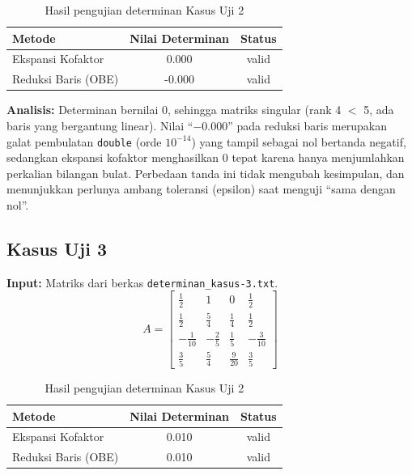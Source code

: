 \documentclass[12pt,a4paper]{report}
\begin{document}
\begin{table}[H]
    \centering
    \caption{Hasil pengujian determinan Kasus Uji 2}
    \begin{tabular}{|l|c|c|}
        \hline 

        \textbf{Metode} & \textbf{Nilai Determinan} & \textbf{Status} \\
        \hline
        Ekspansi Kofaktor & 0.000 & valid \\
        Reduksi Baris (OBE) & -0.000 & valid \\
        \hline
    \end{tabular}
\end{table}
 
\textbf{Analisis:} Determinan bernilai 0, sehingga matriks singular (rank 4 $<$ 5, ada baris yang bergantung linear). Nilai ``$-0.000$'' pada reduksi baris merupakan galat pembulatan \texttt{double} (orde $10^{-14}$) yang tampil sebagai nol bertanda negatif, sedangkan ekspansi kofaktor menghasilkan $0$ tepat karena hanya menjumlahkan perkalian bilangan bulat. Perbedaan tanda ini tidak mengubah kesimpulan, dan menunjukkan perlunya ambang toleransi (epsilon) saat menguji ``sama dengan nol''.

\subsection{Kasus Uji 3}
\textbf{Input:} Matriks dari berkas \texttt{determinan\_kasus-3.txt}.
\[
A = \begin{bmatrix}
    \frac{1}{2} & 1 & 0 &\frac{1}{2} \\
    \frac{1}{2} &\frac{5}{4} &\frac{1}{4} &\frac{1}{2} \\
    -\frac{1}{10}& -\frac{2}{5}& \frac{1}{5}& -\frac{3}{10} \\
    \frac{3}{5} &\frac{5}{4} &\frac{9}{20}& \frac{3}{5}
\end{bmatrix}
\]
 
\begin{table}[H]
    \centering
    \caption{Hasil pengujian determinan Kasus Uji 2}
    \begin{tabular}{|l|c|c|}
        \hline
        \textbf{Metode} & \textbf{Nilai Determinan} & \textbf{Status} \\
        \hline
        Ekspansi Kofaktor & 0.010 & valid \\
        Reduksi Baris (OBE) & 0.010 & valid \\
        \hline
    \end{tabular}
\end{table}
 
\end{document}
